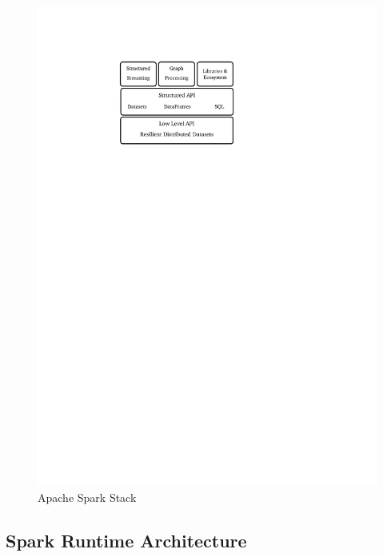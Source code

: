 \begin{figure}[h]
    \centering
    \includegraphics[clip,trim=5cm 21.2cm 8.7cm 3.4cm]{spark-eco.pdf}
    \caption{Apache Spark Stack}
    \label{fig:spark-eco}
\end{figure}

\subsection{Spark Runtime Architecture}
\label{sp:run}

